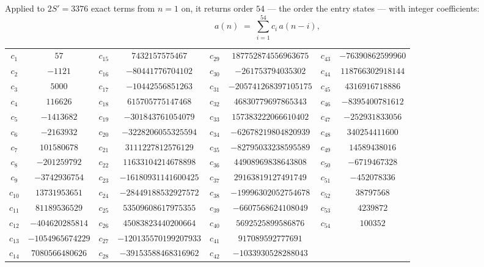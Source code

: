 \documentclass[11pt,a4paper]{article}
\theoremstyle{plain}
\theoremstyle{definition}
\begin{document}
Applied to $2S'=3376$ exact terms from $n=1$ on, it returns order $54$ --- the
order the entry states --- with integer coefficients:
\[
a(n)\;=\;\sum_{i=1}^{54}c_i\,a(n-i),
\]
\begin{center}\small
\begin{tabular}{cccccccc}
$c_{1}$ & $57$ & $c_{15}$ & $7432157575467$ & $c_{29}$ & $187752874556963675$ & $c_{43}$ & $-76390862599960$ \\
$c_{2}$ & $-1121$ & $c_{16}$ & $-80441776704102$ & $c_{30}$ & $-261753794035302$ & $c_{44}$ & $118766302918144$ \\
$c_{3}$ & $5000$ & $c_{17}$ & $-10442556851263$ & $c_{31}$ & $-205741268397105175$ & $c_{45}$ & $4316916718886$ \\
$c_{4}$ & $116626$ & $c_{18}$ & $615705775147468$ & $c_{32}$ & $46830779697865343$ & $c_{46}$ & $-8395400781612$ \\
$c_{5}$ & $-1413682$ & $c_{19}$ & $-301843761054079$ & $c_{33}$ & $157383222066610402$ & $c_{47}$ & $-252931833056$ \\
$c_{6}$ & $-2163932$ & $c_{20}$ & $-3228206055325594$ & $c_{34}$ & $-62678219804820939$ & $c_{48}$ & $340254411600$ \\
$c_{7}$ & $101580678$ & $c_{21}$ & $3111227812576129$ & $c_{35}$ & $-82795033238595589$ & $c_{49}$ & $14589438016$ \\
$c_{8}$ & $-201259792$ & $c_{22}$ & $11633104214678898$ & $c_{36}$ & $44908969838643808$ & $c_{50}$ & $-6719467328$ \\
$c_{9}$ & $-3742936754$ & $c_{23}$ & $-16180931141600425$ & $c_{37}$ & $29163819127491749$ & $c_{51}$ & $-452078336$ \\
$c_{10}$ & $13731953651$ & $c_{24}$ & $-28449188532927572$ & $c_{38}$ & $-19996302052754678$ & $c_{52}$ & $38797568$ \\
$c_{11}$ & $81189536529$ & $c_{25}$ & $53509608617975355$ & $c_{39}$ & $-6607568624108049$ & $c_{53}$ & $4239872$ \\
$c_{12}$ & $-404620285814$ & $c_{26}$ & $45083823440200664$ & $c_{40}$ & $5692525899586876$ & $c_{54}$ & $100352$ \\
$c_{13}$ & $-1054965674229$ & $c_{27}$ & $-120135570199207933$ & $c_{41}$ & $917089592777691$ &  &  \\
$c_{14}$ & $7080566480626$ & $c_{28}$ & $-39153588468316962$ & $c_{42}$ & $-1033930528288043$ &  &  \\
\end{tabular}
\end{center}
\end{document}
